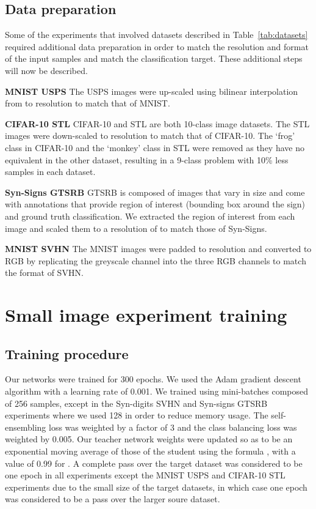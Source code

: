 \documentclass{article}
\begin{document}
\subsection{Data preparation}
\label{app:dataprep}

Some of the experiments that involved datasets described in Table~\ref{tab:datasets} required additional data preparation in order to match the resolution and format of the input samples and match the classification target. These additional steps will now be described.

\textbf{MNIST  USPS} The USPS images were up-scaled using bilinear interpolation from  to  resolution to match that of MNIST.

\textbf{CIFAR-10  STL} CIFAR-10 and STL are both 10-class image datasets. The STL images were down-scaled to  resolution to match that of CIFAR-10. The `frog' class in CIFAR-10 and the `monkey' class in STL were removed as they have no equivalent in the other dataset, resulting in a 9-class problem with 10\% less samples in each dataset.

\textbf{Syn-Signs  GTSRB} GTSRB is composed of images that vary in size and come with annotations that provide region of interest (bounding box around the sign) and ground truth classification. We extracted the region of interest from each image and scaled them to a resolution of  to match those of Syn-Signs.

\textbf{MNIST  SVHN} The MNIST images were padded to  resolution and converted to RGB by replicating the greyscale channel into the three RGB channels to match the format of SVHN.




\section{Small image experiment training}
\label{app:training}

\subsection{Training procedure}

Our networks were trained for 300 epochs. We used the Adam \cite{Kingma:Adam} gradient descent algorithm with a learning rate of 0.001. We trained using mini-batches composed of 256 samples, except in the Syn-digits  SVHN and Syn-signs  GTSRB experiments where we used 128 in order to reduce memory usage. The self-ensembling loss was weighted by a factor of 3 and the class balancing loss was weighted by 0.005. Our teacher network weights  were updated so as to be an exponential moving average of those of the student  using the formula , with a value of 0.99 for . A complete pass over the target dataset was considered to be one epoch in all experiments except the MNIST  USPS and CIFAR-10  STL experiments due to the small size of the target datasets, in which case one epoch was considered to be a pass over the larger soure dataset.
\end{document}
